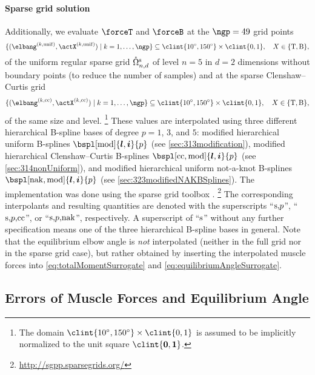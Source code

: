 \paragraph{Sparse grid solution}

Additionally, we evaluate $\forceT$ and $\forceB$ at the $\ngp = 49$
grid points
\begin{equation}
  \{(\elbang^{(k,\mathrm{unif})}, \actX^{(k,\mathrm{unif})}) \mid
  k = 1, \dotsc, \ngp\}
  \subset \clint{\ang{10}, \ang{150}} \times \clint{0, 1},\quad
  X \in \{\mathrm{T}, \mathrm{B}\},
\end{equation}
of the uniform regular sparse grid $\interiorregsgset{n}{d}$ of
level $n = 5$ in $d = 2$ dimensions
without boundary points (to reduce the number of samples)
and at the sparse Clenshaw--Curtis grid
\begin{equation}
  \{(\elbang^{(k,\cc)}, \actX^{(k,\cc)}) \mid
  k = 1, \dotsc, \ngp\}
  \subset \clint{\ang{10}, \ang{150}} \times \clint{0, 1},\quad
  X \in \{\mathrm{T}, \mathrm{B}\},
\end{equation}
of the same size and level.%
\footnote{%
  The domain $\clint{\ang{10}, \ang{150}} \times \clint{0, 1}$
  is assumed to be implicitly normalized to the unit square
  $\clint{\*0, \*1}$.%
}
These values are interpolated using three
different hierarchical B-spline bases of degree $p = 1$, $3$, and $5$:
modified hierarchical uniform B-splines
$\bspl[\modified]{\*l,\*i}{p}$
(see \cref{sec:313modification}),
modified hierarchical Clenshaw--Curtis B-splines
$\bspl[\cc,\modified]{\*l,\*i}{p}$
(see \cref{sec:314nonUniform}), and
modified hierarchical uniform not-a-knot B-splines
$\bspl[\nak,\modified]{\*l,\*i}{p}$
(see \cref{sec:323modifiedNAKBSplines}).
The implementation was done using the sparse grid toolbox
\sgpp{} \cite{Pflueger10Spatially}.%
\footnote{%
  \url{http://sgpp.sparsegrids.org/}%
}
The corresponding interpolants and resulting quantities
are denoted with the superscripts
``$\mathrm{s},\!p$'', ``$\mathrm{s},\!p,\!\mathrm{cc}$'', or ``$\mathrm{s},\!p,\!\mathrm{nak}$'',
respectively.
A superscript of ``$\mathrm{s}$'' without any further specification
means one of the three hierarchical B-spline bases in general.
Note that the equilibrium elbow angle is \emph{not} interpolated
(neither in the full grid nor in the sparse grid case),
but rather obtained by inserting the interpolated muscle forces
into \eqref{eq:totalMomentSurrogate} and \eqref{eq:equilibriumAngleSurrogate}.



\subsection{Errors of Muscle Forces and Equilibrium Angle}
\label{sec:733errors}

